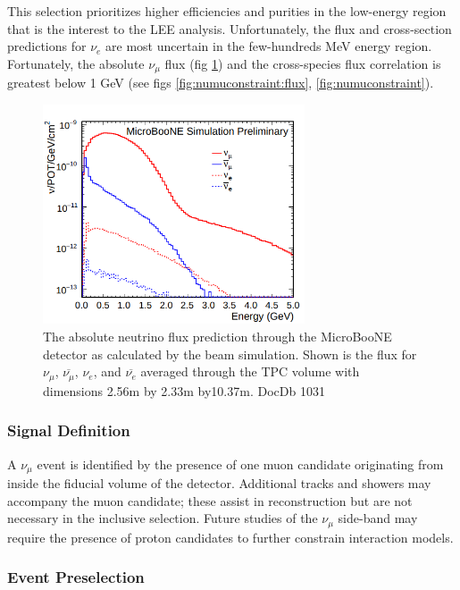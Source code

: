 \par This selection prioritizes higher efficiencies and purities in the low-energy region that is the interest to the LEE analysis. Unfortunately, the flux and cross-section predictions for $\nu_{e}$ are most uncertain in the few-hundreds MeV energy region. Fortunately, the absolute $\nu_{\mu}$ flux (fig \ref{fig:bnb_absoluteflux}) and the cross-species flux correlation is greatest below 1 GeV (see figs \ref{fig:numuconstraint:flux}, \ref{fig:numuconstraint}).

\begin{figure}
    \centering
    \includegraphics[height=6.5cm]{NuMuCCsel/Images/Ryan/absoluteFlux_uBooNE.png} \hspace{2mm}
    \caption{The absolute neutrino flux prediction through the MicroBooNE detector as calculated by the beam simulation. Shown is the flux for $\nu_{\mu}$, $\overline{\nu_{\mu}}$, $\nu_{e}$, and $\overline{\nu_{e}}$ averaged through the TPC volume with dimensions 2.56m by 2.33m by10.37m. DocDb 1031}
    \label{fig:bnb_absoluteflux}
\end{figure}

\subsubsection{Signal Definition}
\label{sssec:NuMUCCsel:constr:signaldef}
\par A $\nu_{\mu}$ event is identified by the presence of one muon candidate originating from inside the fiducial volume of the detector. Additional tracks and showers may accompany the muon candidate; these assist in reconstruction but are not necessary in the inclusive selection. Future studies of the $\nu_{\mu}$ side-band may require the presence of proton candidates to further constrain interaction models.

\subsubsection{Event Preselection}
\label{sssec:NuMUCCsel:constr:preselec}

